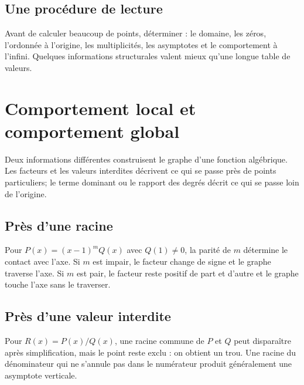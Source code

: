 \documentclass[12pt,a4paper,openany]{book}
\begin{document}
\subsection{Une procédure de lecture}
Avant de calculer beaucoup de points, déterminer : le domaine, les zéros, l'ordonnée à l'origine, les multiplicités, les asymptotes et le comportement à l'infini. Quelques informations structurales valent mieux qu'une longue table de valeurs.


\section{Comportement local et comportement global}

Deux informations différentes construisent le graphe d'une fonction algébrique. Les facteurs et les valeurs interdites décrivent ce qui se passe près de points particuliers; le terme dominant ou le rapport des degrés décrit ce qui se passe loin de l'origine.

\subsection{Près d'une racine}
Pour $P(x)=(x-1)^mQ(x)$ avec $Q(1)\ne0$, la parité de $m$ détermine le contact avec l'axe. Si $m$ est impair, le facteur change de signe et le graphe traverse l'axe. Si $m$ est pair, le facteur reste positif de part et d'autre et le graphe touche l'axe sans le traverser.

\begin{center}
\qquad
{}
\end{center}

\subsection{Près d'une valeur interdite}
Pour $R(x)=P(x)/Q(x)$, une racine commune de $P$ et $Q$ peut disparaître après simplification, mais le point reste exclu : on obtient un trou. Une racine du dénominateur qui ne s'annule pas dans le numérateur produit généralement une asymptote verticale.
\end{document}
